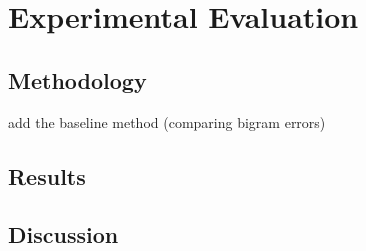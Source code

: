 \documentclass[conference]{IEEEtran}
\begin{document}

\section{Experimental Evaluation}


\subsection{Methodology}

add the baseline method (comparing bigram errors)


\subsection{Results}

\subsection{Discussion}

\end{document}
